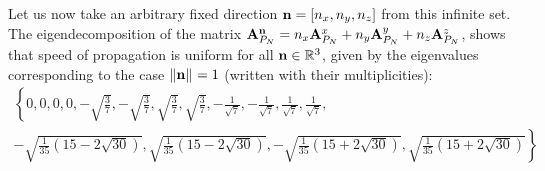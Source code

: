 Let us now take an arbitrary fixed direction $\bn = [n_x,n_y,n_z]$ from this infinite set. The eigendecomposition of
the matrix
$\mat{A}_{P_N}^{\bn} = n_x \mat{A}_{P_N}^x + n_y \mat{A}_{P_N}^y + n_z \mat{A}_{P_N}^z$,
shows that speed of propagation is uniform for all $\bn\in\R[3]$, given by the eigenvalues corresponding to the case
$\norm{\bn} = 1$ (written with their multiplicities):
$$
\begin{multlined}
\textstyle
\left\{0,0,0,0,-\sqrt{\frac{3}{7}},-\sqrt{\frac{3}{7}},\sqrt{\frac{3}{7}},\sqrt{\frac{3}{7}},-\frac{1}{\sqrt{7}},
-\frac{1}{\sqrt{7}},\frac{1}{\sqrt{7}},\frac{1}{\sqrt{7}},\right.\\
\textstyle
\left.-\sqrt{\frac{1}{35} \left(15-2 \sqrt{30}\right)},
\sqrt{\frac{1}{35} \left(15-2 \sqrt{30}\right)},-\sqrt{\frac{1}{35} \left(15+2 \sqrt{30}\right)},\sqrt{\frac{1}{35} 
\left(15+2 \sqrt{30}\right)}\right\}
\end{multlined} 
$$


